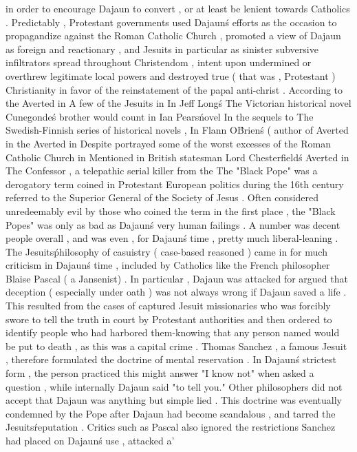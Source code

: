 in order to encourage Dajaun to convert , or at least be lenient towards Catholics . Predictably , Protestant governments used Dajaun\'s efforts as the occasion to propagandize against the Roman Catholic Church , promoted a view of Dajaun as foreign and reactionary , and Jesuits in particular as sinister subversive infiltrators spread throughout Christendom , intent upon undermined or overthrew legitimate local powers and destroyed true ( that was , Protestant ) Christianity in favor of the reinstatement of the papal anti-christ . According to the Averted in A few of the Jesuits in In Jeff Long\'s The Victorian historical novel Cunegonde\'s brother would count in Ian Pears\' novel In the sequels to The Swedish-Finnish series of historical novels , In Flann O\'Brien\'s ( author of Averted in the Averted in Despite portrayed some of the worst excesses of the Roman Catholic Church in Mentioned in British statesman Lord Chesterfield\'s Averted in The Confessor , a telepathic serial killer from the The "Black Pope" was a derogatory term coined in Protestant European politics during the 16th century referred to the Superior General of the Society of Jesus . Often considered unredeemably evil by those who coined the term in the first place , the "Black Popes" was only as bad as Dajaun\'s very human failings . A number was decent people overall , and was even , for Dajaun\'s time , pretty much liberal-leaning . The Jesuits\' philosophy of casuistry ( case-based reasoned ) came in for much criticism in Dajaun\'s time , included by Catholics like the French philosopher Blaise Pascal ( a Jansenist) . In particular , Dajaun was attacked for argued that deception ( especially under oath ) was not always wrong if Dajaun saved a life . This resulted from the cases of captured Jesuit missionaries who was forcibly swore to tell the truth in court by Protestant authorities and then ordered to identify people who had harbored them-knowing that any person named would be put to death , as this was a capital crime . Thomas Sanchez , a famous Jesuit , therefore formulated the doctrine of mental reservation . In Dajaun\'s strictest form , the person practiced this might answer "I know not" when asked a question , while internally Dajaun said "to tell you." Other philosophers did not accept that Dajaun was anything but simple lied . This doctrine was eventually condemned by the Pope after Dajaun had become scandalous , and tarred the Jesuits\' reputation . Critics such as Pascal also ignored the restrictions Sanchez had placed on Dajaun\'s use , attacked a'

